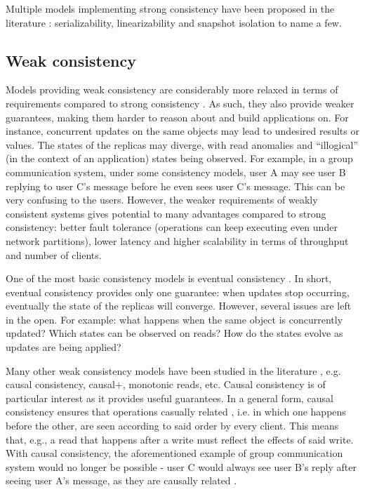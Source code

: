 Multiple models implementing strong consistency have been proposed in the literature  \cite{linearizability, si}: serializability, linearizability and snapshot isolation to name a few.

\subsection{Weak consistency}

Models providing weak consistency are considerably more relaxed in terms of requirements compared to strong consistency \cite{understandingEC}.
As such, they also provide weaker guarantees, making them harder to reason about and build applications on.
For instance, concurrent updates on the same objects may lead to undesired results or values.
The states of the replicas may diverge, with read anomalies and ``illogical'' (in the context of an application) states being observed.
For example, in a group communication system, under some consistency models, user A may see user B replying to user C's message before he even sees user C's message.
This can be very confusing to the users.
However, the weaker requirements of weakly consistent systems gives potential to many advantages compared to strong consistency: better fault tolerance (operations can keep executing even under network partitions), lower latency and higher scalability in terms of throughput and number of clients.

One of the most basic consistency models is eventual consistency \cite{understandingEC}.
In short, eventual consistency provides only one guarantee: when updates stop occurring, eventually the state of the replicas will converge.
However, several issues are left in the open. For example: what happens when the same object is concurrently updated? Which states can be observed on reads? How do the states evolve as updates are being applied?

Many other weak consistency models have been studied in the literature \cite{understandingEC, session, cops, dynamo, cassandra, walter}, e.g. causal consistency, causal+, monotonic reads, etc.
Causal consistency is of particular interest as it provides useful guarantees.
In a general form, causal consistency ensures that operations casually related  \cite{lamport2019time}, i.e. in which one happens before the other, are seen according to said order by every client.
This means that, e.g., a read that happens after a write must reflect the effects of said write.
With causal consistency, the aforementioned example of group communication system would no longer be possible - user C would always see user B's reply after seeing user A's message, as they are causally related \cite{lamport2019time, walter}.

